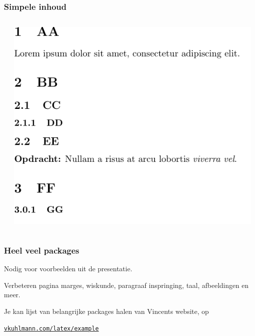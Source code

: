 \documentclass{cursuspresentatie}
\def\importslide#1#2{%
	{#2}
}
\begin{document}
\begin{frame}
	\frametitle{Simpele inhoud}

	\begin{columns}
		\begin{column}{0.5\textwidth}
		\end{column}
		\begin{column}{0.5\textwidth}
			\includegraphics[width=\linewidth,height=0.8\textheight,keepaspectratio]{assets/outdir/simpleContents.pdf}
		\end{column}
	\end{columns}
\end{frame}

\begin{frame}
	\frametitle{Heel veel packages}

	Nodig voor voorbeelden uit de presentatie.

	\medskip

	Verbeteren pagina marges, wiskunde, paragraaf inspringing, taal,
	afbeeldingen en meer.

	\medskip
	
	Je kan lijst van belangrijke packages halen van Vincents website, op
	\begin{center}
		\href{https://vkuhlmann.com/latex/example}{\ul{\texttt{vkuhlmann.com/latex/example}}}
	\end{center}
\end{frame}

\end{document}
